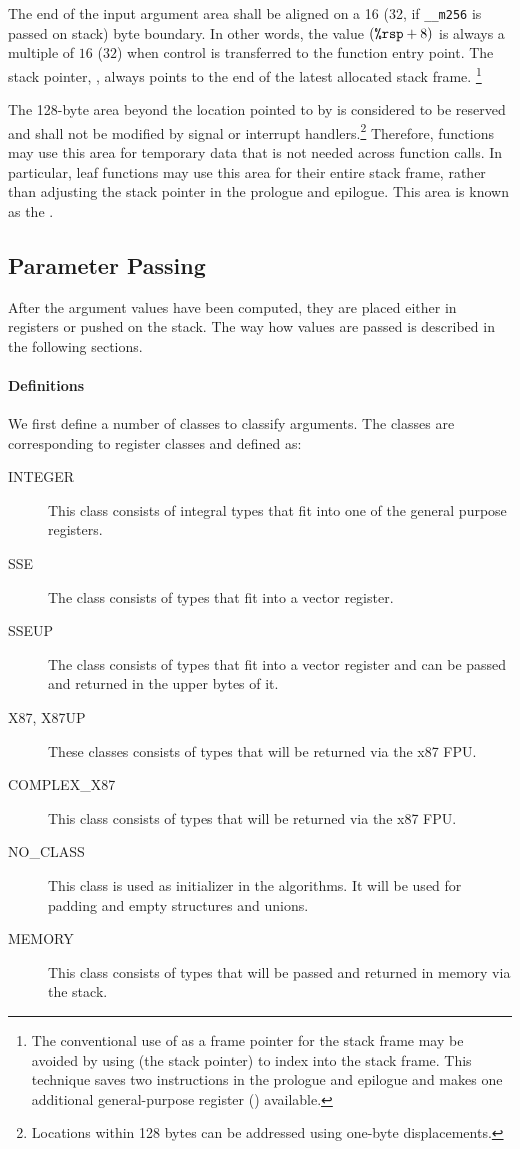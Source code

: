 The end of the input argument area shall be aligned on a 16 (32, if
\texttt{__m256} is passed on stack) byte boundary.  In other
words, the value $({\texttt{\%rsp}} + 8)$ is always a multiple of $16$ ($32$) when
control is transferred to the function entry point.  The
stack pointer, \RSP, always points to the end of the latest allocated
stack frame.  \footnote{The conventional use of \RBP{} as a frame
  pointer for the stack frame may be avoided by using \RSP (the stack
  pointer) to index into the stack frame.  This technique saves two
  instructions in the prologue and epilogue and makes one additional
  general-purpose register (\RBP) available.}

The 128-byte area beyond the location pointed to by \RSP is considered
to be reserved and shall not be modified by signal or interrupt
handlers.\footnote{Locations within 128 bytes can be addressed using
  one-byte displacements.}  Therefore, functions may use this area for
temporary data that is not needed across function calls.  In
particular, leaf functions may use this area for their entire stack
frame, rather than adjusting the stack pointer in the prologue and
epilogue.  This area is known as the .

\subsection{Parameter Passing}
\label{sec-calling-conventions}

After the argument values have been computed, they are placed either in
registers or pushed on the stack.  The way how values are passed is
described in the following sections.

\paragraph{Definitions}
We first define a number of classes to classify arguments.  The
classes are corresponding to \xARCH register classes and defined as:

\begin{description}
\item[INTEGER] This class consists of integral types that fit into one of
  the general purpose registers.
\item[SSE] The class consists of types that fit into a vector register.
\item[SSEUP] The class consists of types that fit into a vector
  register and can be passed and returned in the upper bytes of it.
\item[X87, X87UP] These classes consists of types that will be returned via
  the x87 FPU.
\item[COMPLEX\_X87] This class consists of types that will be returned
  via the x87 FPU.
\item[NO\_CLASS] This class is used as initializer in the algorithms.  It
  will be used for padding and empty structures and unions.
\item[MEMORY] This class consists of types that will be passed and
  returned in memory via the stack.
\end{description}



